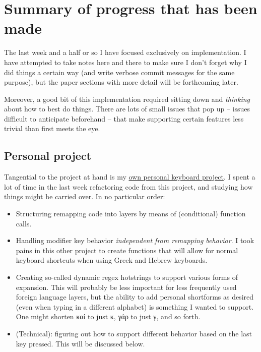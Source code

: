 \documentclass[11pt]{article}
\date{\today}
\title{}
\begin{document}
\tableofcontents


\section{Summary of progress that has been made}
\label{sec:org2afac17}

The last week and a half or so I have focused exclusively on implementation. I have attempted to take notes here and there to make sure I don't forget why I did things a certain way (and write verbose commit messages for the same purpose), but the paper sections with more detail will be forthcoming later.

Moreover, a good bit of this implementation required sitting down and \emph{thinking} about how to best do things. There are lots of small issues that pop up -- issues difficult to anticipate beforehand -- that make supporting certain features less trivial than first meets the eye.

\subsection{Personal project}
\label{sec:orgde0ea2d}

Tangential to the project at hand is my \href{https://github.com/StevenTammen/hieam}{own personal keyboard project}. I spent a lot of time in the last week refactoring code from this project, and studying how things might be carried over. In no particular order:

\begin{itemize}
\item Structuring remapping code into layers by means of (conditional) function calls.
\item Handling modifier key behavior \emph{independent from remapping behavior}. I took pains in this other project to create functions that will allow for normal keyboard shortcuts when using Greek and Hebrew keyboards.
\item Creating so-called dynamic regex hotstrings to support various forms of expansion. This will probably be less important for less frequently used foreign language layers, but the ability to add personal shortforms as desired (even when typing in a different alphabet) is something I wanted to support. One might shorten καί to just κ, γάρ to just γ, and so forth.
\item (Technical): figuring out how to support different behavior based on the last key pressed. This will be discussed below.
\end{itemize}
\end{document}
